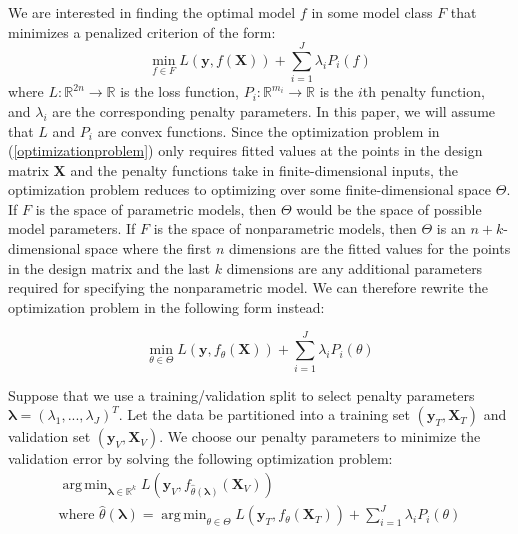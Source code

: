 \documentclass[10pt,letterpaper]{article}
\DeclareMathOperator*{\argmin}{arg\,min}
\begin{document}
We are interested in finding the optimal model $f$ in some model class $F$ that minimizes a penalized criterion of the form:
\begin{equation}
\min_{f \in F} L(\boldsymbol{y}, f(\boldsymbol{X})) + \sum\limits_{i=1}^J \lambda_i P_i(f)
\label{optimizationproblem}
\end{equation}
where $L:\mathbb{R}^{2n} \rightarrow \mathbb{R}$ is the loss function, $P_i:\mathbb{R}^{m_i} \rightarrow \mathbb{R}$ is the $i$th penalty function, and $\lambda_i$ are the corresponding penalty parameters. In this paper, we will assume that $L$ and $P_i$ are convex functions. Since the optimization problem in (\ref{optimizationproblem}) only requires fitted values at the points in the design matrix $\boldsymbol{X}$ and the penalty functions take in finite-dimensional inputs, the optimization problem reduces to optimizing over some finite-dimensional space $\Theta$. If $F$ is the space of parametric models, then $\Theta$ would be the space of possible model parameters. If $F$ is the space of nonparametric models, then $\Theta$ is an $n+k$-dimensional space where the first $n$ dimensions are the fitted values for the points in the design matrix and the last $k$ dimensions are any additional parameters required for specifying the nonparametric model. We can therefore rewrite the optimization problem in the following form instead:

\begin{equation}
\min_{\theta \in \Theta} L(\boldsymbol{y}, f_\theta(\boldsymbol{X})) + \sum\limits_{i=1}^J \lambda_i P_i(\theta)
\end{equation}

Suppose that we use a training/validation split to select penalty parameters $\boldsymbol{\lambda} = (\lambda_1, ..., \lambda_J)^T$. Let the data be partitioned into a training set $(\boldsymbol{y}_T , \boldsymbol{X}_T)$ and validation set $(\boldsymbol{y}_V, \boldsymbol{X}_V)$. We choose our penalty parameters to minimize the validation error by solving the following optimization problem:
\begin{equation}
\begin{array}{c}
\argmin_{\boldsymbol{\lambda} \in \mathbb{R}^k} L(\boldsymbol{y}_V, f_{\hat{\theta}(\boldsymbol{\lambda})}(\boldsymbol{X}_V)) \\
\text{where } {\hat{\theta}(\boldsymbol{\lambda})} = \argmin_{\theta \in \Theta} L(\boldsymbol{y}_T, f_\theta (\boldsymbol{X}_T)) + \sum\limits_{i=1}^J \lambda_i P_i(\theta)
\end{array}
\label{jointopt2}
\end{equation}
\end{document}

